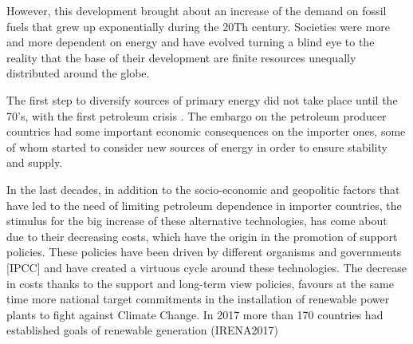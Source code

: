 
However, this development brought about an increase of the demand on fossil fuels that grew up exponentially during the 20Th century. Societies were more and more dependent on energy and have evolved turning a blind eye to the reality that the base of their development are finite resources unequally distributed around the globe.


The first step to diversify sources of primary energy did not take place until the 70's, with the first petroleum crisis \cite*{Sorensen1991}. The embargo on the petroleum producer countries had some important economic consequences on the importer ones, some of whom started to consider new sources of energy in order to ensure stability and supply.



In the last decades, in addition to the socio-economic and geopolitic factors that have led to the need of limiting petroleum dependence in importer countries, the stimulus for the big increase of these alternative technologies, has come about due to their decreasing costs, which have the origin in the promotion of support policies. These policies have been driven by different organisms and governments [IPCC] and have created a virtuous cycle around these technologies. The decrease in costs thanks to the support and long-term view policies, favours at the same time more national target commitments in the installation of renewable power plants to fight against Climate Change. In 2017 more than 170 countries had established goals of renewable generation (IRENA2017)


